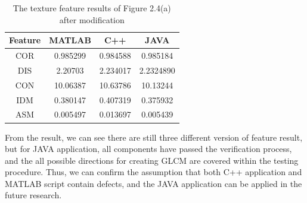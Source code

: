 \begin{table}[!t]
\begin{center}
\begin{tabular}{||c c c c||}
\hline
Feature & MATLAB & C++ & JAVA\\[0.7ex]
\hline\hline
COR & 0.985299 & 0.984588 & 0.985184 \\
DIS & 2.20703 & 2.234017 & 2.2324890\\
CON & 10.06387 & 10.63786 & 10.13244 \\
IDM & 0.380147 & 0.407319 & 0.375932 \\
ASM & 0.005497 & 0.013697 & 0.005439\\
\hline
\end{tabular}
\caption{The texture feature results of Figure 2.4(a) after modification}
\end{center}
\end{table}
From the result, we can see there are still three different version of feature result, but for JAVA application, all components have passed the verification process, and the all possible directions for creating GLCM are covered within the testing procedure. Thus, we can confirm the assumption that both C++ application and MATLAB script contain defects, and the JAVA application can be applied in the future research.

